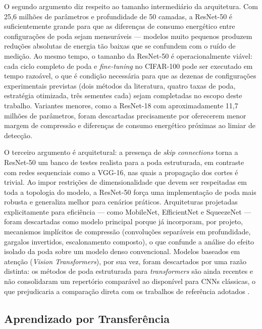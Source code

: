 O segundo argumento diz respeito ao tamanho intermediário da arquitetura. Com 25,6 milhões de parâmetros e profundidade de 50 camadas, a ResNet-50 é suficientemente grande para que as diferenças de consumo energético entre configurações de poda sejam mensuráveis --- modelos muito pequenos produzem reduções absolutas de energia tão baixas que se confundem com o ruído de medição. Ao mesmo tempo, o tamanho da ResNet-50 é operacionalmente viável: cada ciclo completo de poda e \textit{fine-tuning} no CIFAR-100 pode ser executado em tempo razoável, o que é condição necessária para que as dezenas de configurações experimentais previstas (dois métodos da literatura, quatro taxas de poda, estratégia otimizada, três sementes cada) sejam completadas no escopo deste trabalho. Variantes menores, como a ResNet-18 com aproximadamente 11,7 milhões de parâmetros, foram descartadas precisamente por oferecerem menor margem de compressão e diferenças de consumo energético próximas ao limiar de detecção.

O terceiro argumento é arquitetural: a presença de \textit{skip connections} torna a ResNet-50 um banco de testes realista para a poda estruturada, em contraste com redes sequenciais como a VGG-16, nas quais a propagação dos cortes é trivial. Ao impor restrições de dimensionalidade que devem ser respeitadas em toda a topologia do modelo, a ResNet-50 força uma implementação de poda mais robusta e generaliza melhor para cenários práticos. Arquiteturas projetadas explicitamente para eficiência --- como MobileNet, EfficientNet e SqueezeNet --- foram descartadas como modelo principal porque já incorporam, por projeto, mecanismos implícitos de compressão (convoluções separáveis em profundidade, gargalos invertidos, escalonamento composto), o que confunde a análise do efeito isolado da poda sobre um modelo denso convencional. Modelos baseados em atenção (\textit{Vision Transformers}), por sua vez, foram descartados por uma razão distinta: os métodos de poda estruturada para \textit{transformers} são ainda recentes e não consolidaram um repertório comparável ao disponível para CNNs clássicas, o que prejudicaria a comparação direta com os trabalhos de referência adotados \cite{Han2015, Li2017}.

\subsection{Aprendizado por Transferência}\label{subsec:transfer_learning}

